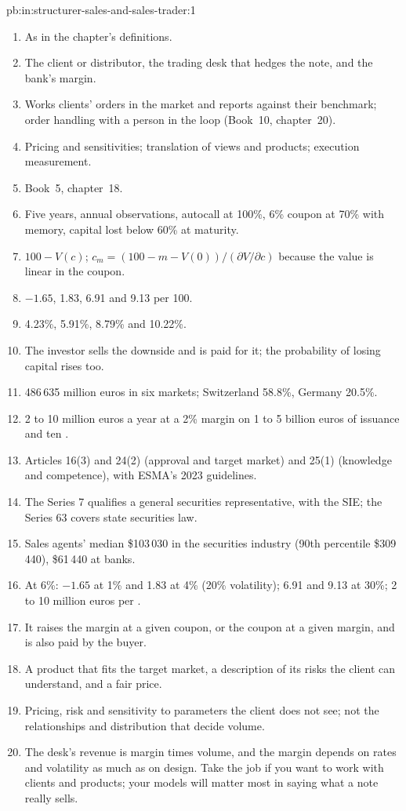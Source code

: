 \begin{solution}{pb:in:structurer-sales-and-sales-trader:1}
\begin{enumerate}
\item As in the chapter's definitions.
\item The client or distributor, the trading desk that hedges the note, and the bank's margin.
\item Works clients' orders in the market and reports against their benchmark; order handling with a person in the loop
(Book~10, chapter~20).
\item Pricing and sensitivities; translation of views and products; execution measurement.
\item Book~5, chapter~18.
\item Five years, annual observations, autocall at 100\%, 6\% coupon at 70\% with memory, capital lost below 60\% at
maturity.
\item $100-V(c)$; $c_m=(100-m-V(0))/(\partial V/\partial c)$ because the value is linear in the coupon.
\item $-1.65$, 1.83, 6.91 and 9.13 per 100.
\item 4.23\%, 5.91\%, 8.79\% and 10.22\%.
\item The investor sells the downside and is paid for it; the probability of losing capital rises too.
\item 486\,635 million euros in six markets; Switzerland 58.8\%, Germany 20.5\%.
\item 2 to 10 million euros a year at a 2\% margin on 1 to 5 billion euros of issuance and ten .
\item Articles 16(3) and 24(2) (approval and target market) and 25(1) (knowledge and competence), with ESMA's 2023
guidelines.
\item The Series 7 qualifies a general securities representative, with the SIE; the Series 63 covers state securities law.
\item Sales agents' median \$103\,030 in the securities industry (90th percentile \$309\,440), \$61\,440 at banks.
\item At 6\%: $-1.65$ at 1\% and 1.83 at 4\% (20\% volatility); 6.91 and 9.13 at 30\%; 2 to 10 million euros per
.
\item It raises the margin at a given coupon, or the coupon at a given margin, and is also paid by the buyer.
\item A product that fits the target market, a description of its risks the client can understand, and a fair price.
\item Pricing, risk and sensitivity to parameters the client does not see; not the relationships and distribution that
decide volume.
\item The desk's revenue is margin times volume, and the margin depends on rates and volatility as much as on design.
Take the job if you want to work with clients and products; your models will matter most in saying what a note really
sells.
\end{enumerate}
\end{solution}

